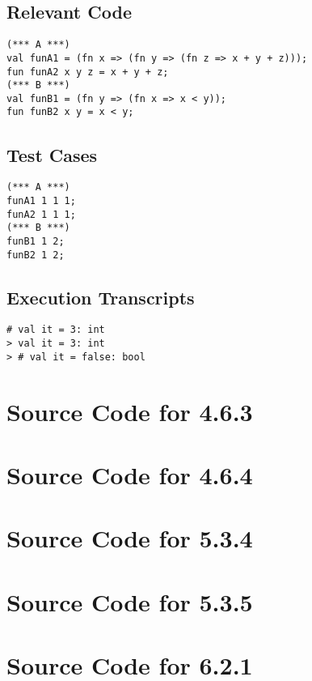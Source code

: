 \documentclass[twoside]{report}
\begin{document}
\section{Relevant Code}
    \begin{lstlisting}[frame=trBL]
(*** A ***)
val funA1 = (fn x => (fn y => (fn z => x + y + z)));
fun funA2 x y z = x + y + z;
(*** B ***)
val funB1 = (fn y => (fn x => x < y));
fun funB2 x y = x < y;
    \end{lstlisting}
\section{Test Cases}
    \begin{scriptsize}
    \begin{verbatim}
(*** A ***)
funA1 1 1 1;
funA2 1 1 1;
(*** B ***)
funB1 1 2;
funB2 1 2;
    \end{verbatim}
    \end{scriptsize}
\section{Execution Transcripts}
\begin{scriptsize}
    \begin{verbatim}
# val it = 3: int
> val it = 3: int
> # val it = false: bool
    \end{verbatim}
\end{scriptsize}

\appendix{}
\chapter{Source Code for 4.6.3}
\label{cha:apdx-a}
%

\chapter{Source Code for 4.6.4}
\label{cha:apdx-b}
%

\chapter{Source Code for 5.3.4}
\label{cha:apdx-c}
%

\chapter{Source Code for 5.3.5}
\label{cha:apdx-d}
%

\chapter{Source Code for 6.2.1}
\label{cha:apdx-e}
%
\end{document}
